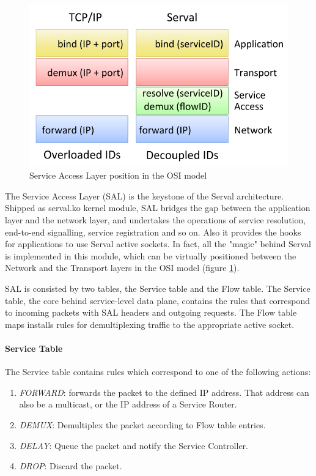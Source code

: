 \begin{figure}
\centering
{}
\includegraphics[scale=0.3]{figures/sal_position}
\caption[Service Access Layer position]{Service Access Layer position in the OSI model}
\label{fig:sal_position}
\end{figure}

The Service Access Layer (SAL) is the keystone of the Serval architecture.
Shipped as serval.ko kernel module, SAL bridges the gap between the application layer and the network layer, and undertakes the operations of service resolution, end-to-end signalling, service registration and so on.
Also it provides the hooks for applications to use Serval active sockets.
In fact, all the "magic" behind Serval is implemented in this module, which can be virtually positioned between the Network and the Transport layers in the OSI model (figure \ref{fig:sal_position}).

SAL is consisted by two tables, the Service table and the Flow table.
The Service table, the core behind service-level data plane, contains the rules that correspond to incoming packets with SAL headers and outgoing requests.
The Flow table maps installs rules for demultiplexing traffic to the appropriate active socket.

\paragraph{Service Table} The Service table contains rules which correspond to one of the following actions:
\begin{enumerate} \itemsep1pt \parskip0pt 
  \item \emph{FORWARD}: forwards the packet to the defined IP address.
  That address can also be a multicast, or the IP address of a Service Router. 
  \item \emph{DEMUX}: Demultiplex the packet according to Flow table entries.
  \item \emph{DELAY}: Queue the packet and notify the Service Controller.
  \item \emph{DROP}: Discard the packet.
\end{enumerate}

